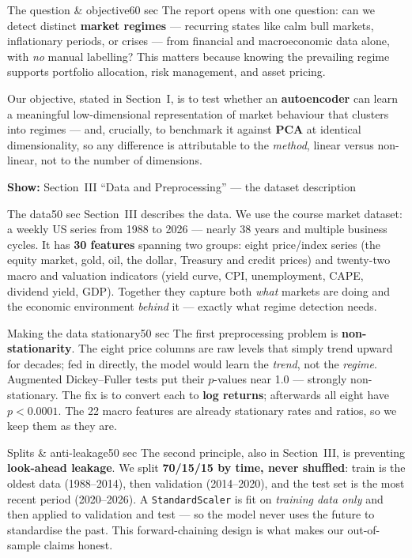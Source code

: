 \documentclass[11pt]{article}
\newcommand{\reportref}[1]{{\small\color{ink}\textbf{Show:} #1}}
\begin{document}
\begin{cue}{The question \& objective}{60 sec}
The report opens with one question: can we detect distinct \textbf{market
regimes} --- recurring states like calm bull markets, inflationary periods, or
crises --- from financial and macroeconomic data alone, with \emph{no} manual
labelling? This matters because knowing the prevailing regime supports portfolio
allocation, risk management, and asset pricing.

Our objective, stated in Section~I, is to test whether an \textbf{autoencoder} can
learn a meaningful low-dimensional representation of market behaviour that
clusters into regimes --- and, crucially, to benchmark it against \textbf{PCA} at
identical dimensionality, so any difference is attributable to the \emph{method},
linear versus non-linear, not to the number of dimensions.
\end{cue}

\begin{slide}\reportref{Section~III ``Data and Preprocessing'' --- the dataset description}\end{slide}
\begin{cue}{The data}{50 sec}
Section~III describes the data. We use the course market dataset: a weekly US
series from 1988 to 2026 --- nearly 38 years and multiple business cycles. It has
\textbf{30 features} spanning two groups: eight price/index series (the equity
market, gold, oil, the dollar, Treasury and credit prices) and twenty-two macro
and valuation indicators (yield curve, CPI, unemployment, CAPE, dividend yield,
GDP). Together they capture both \emph{what} markets are doing and the economic
environment \emph{behind} it --- exactly what regime detection needs.
\end{cue}

\begin{cue}{Making the data stationary}{50 sec}
The first preprocessing problem is \textbf{non-stationarity}. The eight price
columns are raw levels that simply trend upward for decades; fed in directly, the
model would learn the \emph{trend}, not the \emph{regime}. Augmented
Dickey--Fuller tests put their $p$-values near 1.0 --- strongly non-stationary.
The fix is to convert each to \textbf{log returns}; afterwards all eight have
$p<0.0001$. The 22 macro features are already stationary rates and ratios, so we
keep them as they are.
\end{cue}

\begin{cue}{Splits \& anti-leakage}{50 sec}
The second principle, also in Section~III, is preventing \textbf{look-ahead
leakage}. We split \textbf{70/15/15 by time, never shuffled}: train is the oldest
data (1988–2014), then validation (2014–2020), and the test set is the most recent
period (2020–2026). A \texttt{StandardScaler} is fit on \emph{training data only}
and then applied to validation and test --- so the model never uses the future to
standardise the past. This forward-chaining design is what makes our
out-of-sample claims honest.
\end{cue}
\end{document}
